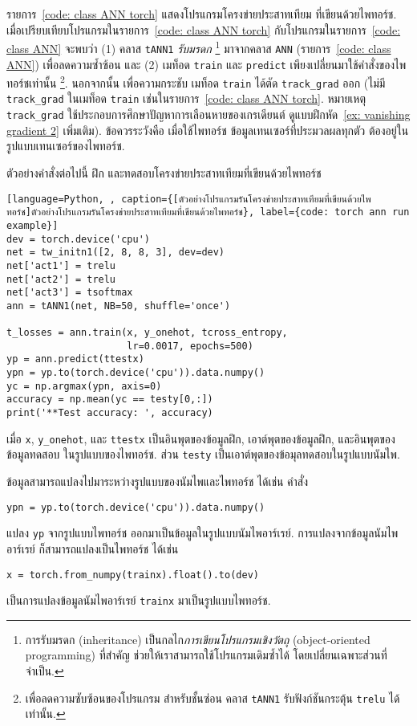 รายการ~\ref{code: class ANN torch}
แสดงโปรแกรมโครงข่ายประสาทเทียม
ที่เขียนด้วยไพทอร์ช.
เมื่อเปรียบเทียบโปรแกรมในรายการ~\ref{code: class ANN torch}
กับโปรแกรมในรายการ~\ref{code: class ANN}
จะพบว่า
(1) คลาส \verb|tANN1| \textit{รับมรดก}%
\footnote{%
การรับมรดก (inheritance) เป็นกลไก\textit{การเขียนโปรแกรมเชิงวัตถุ} (object-oriented programming) ที่สำคัญ ช่วยให้เราสามารถใช้โปรแกรมเดิมซ้ำได้ โดยเปลี่ยนเฉพาะส่วนที่จำเป็น.
}
มาจากคลาส \texttt{ANN} (รายการ~\ref{code: class ANN})
เพื่อลดความซ้ำซ้อน
และ
(2) เมท็อด \verb|train| และ \verb|predict| เพียงเปลี่ยนมาใช้คำสั่งของไพทอร์ชเท่านั้น%
\footnote{%
เพื่อลดความซับซ้อนของโปรแกรม
สำหรับชั้นซ่อน 
คลาส \texttt{tANN1} รับฟังก์ชันกระตุ้น \texttt{trelu} ได้เท่านั้น.
}.
นอกจากนั้น เพื่อความกระชับ เมท็อด \verb|train|
ได้ตัด \verb|track_grad| ออก (ไม่มี \verb|track_grad| ในเมท็อด \verb|train| เช่นในรายการ~\ref{code: class ANN torch}.
หมายเหตุ \verb|track_grad| ใช้ประกอบการศึกษาปัญหาการเลือนหายของเกรเดียนต์ ดูแบบฝึกหัด~\ref{ex: vanishing gradient 2} เพิ่มเติม).
ข้อควรระวังคือ เมื่อใช้ไพทอร์ช ข้อมูลเทนเซอร์ที่ประมวลผลทุกตัว ต้องอยู่ในรูปแบบเทนเซอร์ของไพทอร์ช.

ตัวอย่างคำสั่งต่อไปนี้ ฝึก และทดสอบโครงข่ายประสาทเทียมที่เขียนด้วยไพทอร์ช
\begin{lstlisting}[language=Python, , caption={[ตัวอย่างโปรแกรมรันโครงข่ายประสาทเทียมที่เขียนด้วยไพทอร์ช]ตัวอย่างโปรแกรมรันโครงข่ายประสาทเทียมที่เขียนด้วยไพทอร์ช}, label={code: torch ann run example}]
dev = torch.device('cpu')
net = tw_initn1([2, 8, 8, 3], dev=dev)
net['act1'] = trelu
net['act2'] = trelu
net['act3'] = tsoftmax
ann = tANN1(net, NB=50, shuffle='once')

t_losses = ann.train(x, y_onehot, tcross_entropy, 
                     lr=0.0017, epochs=500)
yp = ann.predict(ttestx)
ypn = yp.to(torch.device('cpu')).data.numpy()
yc = np.argmax(ypn, axis=0)
accuracy = np.mean(yc == testy[0,:])
print('**Test accuracy: ', accuracy)
\end{lstlisting}
เมื่อ \texttt{x}, \verb|y_onehot|, และ \texttt{ttestx}
เป็นอินพุตของข้อมูลฝึก, เอาต์พุตของข้อมูลฝึก, และอินพุตของข้อมูลทดสอบ ในรูปแบบของไพทอร์ช.
ส่วน \texttt{testy} เป็นเอาต์พุตของข้อมุลทดสอบในรูปแบบนัมไพ.

ข้อมูลสามารถแปลงไปมาระหว่างรูปแบบของนัมไพและไพทอร์ช ได้เช่น
คำสั่ง 
\begin{Verbatim}[fontsize=\small]
ypn = yp.to(torch.device('cpu')).data.numpy()
\end{Verbatim}
แปลง \verb|yp| จากรูปแบบไพทอร์ช ออกมาเป็นข้อมูลในรูปแบบนัมไพอาร์เรย์.
การแปลงจากข้อมูลนัมไพอาร์เรย์ ก็สามารถแปลงเป็นไพทอร์ช ได้เช่น
\begin{Verbatim}[fontsize=\small]
x = torch.from_numpy(trainx).float().to(dev)
\end{Verbatim}
เป็นการแปลงข้อมูลนัมไพอาร์เรย์ \verb|trainx| มาเป็นรูปแบบไพทอร์ช.

